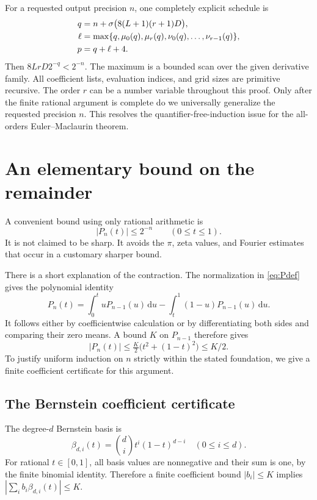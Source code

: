 \documentclass[11pt]{article}
\theoremstyle{definition}
\newcommand{\abs}[1]{\left|#1\right|}
\newcommand{\dd}{\,\mathrm{d}}
\begin{document}
For a requested output precision \(n\), one completely explicit
schedule is
\begin{align}
 q&=n+\sigma\bigl(8(L+1)(r+1)D\bigr),\notag\\
 \ell&=\max\{q,\mu_0(q),\mu_r(q),
                         \nu_0(q),\ldots,\nu_{r-1}(q)\},\notag\\
 p&=q+\ell+4.\label{eq:EMfinalschedule}
\end{align}
Then \(8LrD2^{-q}<2^{-n}\).  The maximum is a bounded scan over the
given derivative family.  All coefficient lists, evaluation indices,
and grid sizes are primitive recursive.  The order \(r\) can be a
number variable throughout this proof.  Only after the finite rational
argument is complete do we universally generalize the requested
precision \(n\).  This resolves the quantifier-free-induction issue
for the all-orders Euler--Maclaurin theorem.

\section{An elementary bound on the remainder}\label{sec:remainder}

A convenient bound using only rational arithmetic is
\begin{equation}
 \abs{P_n(t)}\le2^{-n}\qquad(0\le t\le1).\label{eq:halfbound}
\end{equation}
It is not claimed to be sharp.  It avoids the \(\pi\), zeta values,
and Fourier estimates that occur in a customary sharper bound.

There is a short explanation of the contraction.  The normalization
in \eqref{eq:Pdef} gives the polynomial identity
\[
 P_n(t)=\int_0^t uP_{n-1}(u)\dd u
            -\int_t^1(1-u)P_{n-1}(u)\dd u.
\]
It follows either by coefficientwise calculation or by differentiating
both sides and comparing their zero means.  A bound \(K\) on
\(P_{n-1}\) therefore gives
\[
 \abs{P_n(t)}\le\tfrac K2\bigl(t^2+(1-t)^2\bigr)\le K/2.
\]
To justify uniform induction on \(n\) strictly within the stated
foundation, we give a finite coefficient certificate for this argument.

\subsection{The Bernstein coefficient certificate}

The degree-\(d\) Bernstein basis is
\[
 \beta_{d,i}(t)=\binom di t^i(1-t)^{d-i}\quad(0\le i\le d).
\]
For rational \(t\in[0,1]\), all basis values are nonnegative and
their sum is one, by the finite binomial identity.  Therefore a finite
coefficient bound \(\abs{b_i}\le K\) implies
\(\abs{\sum_i b_i\beta_{d,i}(t)}\le K\).
\end{document}
